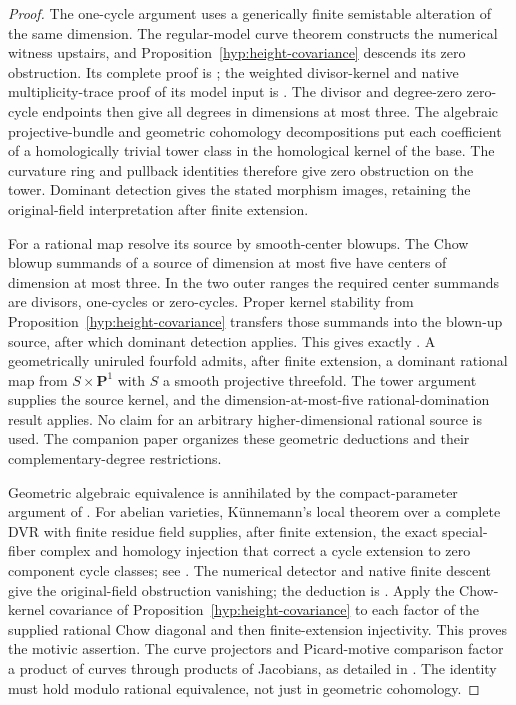 \documentclass[11pt,a4paper]{article}
\theoremstyle{definition}
\theoremstyle{remark}
\numberwithin{equation}{section}
\begin{document}
\begin{proof}
The one-cycle argument uses a generically finite semistable alteration of the same dimension. The regular-model curve theorem constructs the numerical witness upstairs, and Proposition~\ref{hyp:height-covariance} descends its zero obstruction. Its complete proof is \cite[Theorem \texttt{r16G:one-cycles}]{Geo16}; the weighted divisor-kernel and native multiplicity-trace proof of its model input is \cite{Curve12}. The divisor and degree-zero zero-cycle endpoints then give all degrees in dimensions at most three. The algebraic projective-bundle and geometric cohomology decompositions put each coefficient of a homologically trivial tower class in the homological kernel of the base. The curvature ring and pullback identities therefore give zero obstruction on the tower. Dominant detection gives the stated morphism images, retaining the original-field interpretation after finite extension.

For a rational map resolve its source by smooth-center blowups. The Chow blowup summands of a source of dimension at most five have centers of dimension at most three. In the two outer ranges the required center summands are divisors, one-cycles or zero-cycles. Proper kernel stability from Proposition~\ref{hyp:height-covariance} transfers those summands into the blown-up source, after which dominant detection applies. This gives exactly \cite[Theorems \texttt{r16cov:rational-low-dimension}, \texttt{r16cov:rational-outer} and Corollary \texttt{r16cov:unirational}]{CV16}. A geometrically uniruled fourfold admits, after finite extension, a dominant rational map from $S\times\mathbf P^1$ with $S$ a smooth projective threefold. The tower argument supplies the source kernel, and the dimension-at-most-five rational-domination result applies. No claim for an arbitrary higher-dimensional rational source is used. The companion paper \cite{SC} organizes these geometric deductions and their complementary-degree restrictions.

Geometric algebraic equivalence is annihilated by the compact-parameter argument of \cite[Theorem \texttt{r12p:geometric-algebraic}]{R12Parameters}. For abelian varieties, K\"unnemann's local theorem over a complete DVR with finite residue field supplies, after finite extension, the exact special-fiber complex and homology injection that correct a cycle extension to zero component cycle classes; see \cite[Sections 5.5--5.8 and Theorem 6.6]{Kun}. The numerical detector and native finite descent give the original-field obstruction vanishing; the deduction is \cite[Theorem \texttt{r16ab:local-G}]{AB16}. Apply the Chow-kernel covariance of Proposition~\ref{hyp:height-covariance} to each factor of the supplied rational Chow diagonal and then finite-extension injectivity. This proves the motivic assertion. The curve projectors and Picard-motive comparison factor a product of curves through products of Jacobians, as detailed in \cite[Theorem \texttt{r16ab:motivic} and Corollary \texttt{r16ab:curve-products}]{AB16}. The identity must hold modulo rational equivalence, not just in geometric cohomology.
\end{proof}
\end{document}
